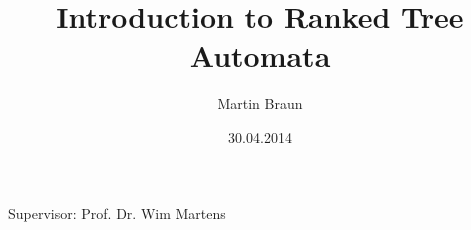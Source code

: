 \documentclass{beamer}
\title{Introduction to Ranked Tree Automata}
\author{Martin Braun}
\institute[University of Bayreuth] %
{
	University of Bayreuth
}
\date{30.04.2014}
\begin{document}
\begin{frame}
  \titlepage
   \begin{center}
	Supervisor: Prof. Dr. Wim Martens
   \end{center}
\end{frame}

\newcommand{\nfaExample}{
	 \begin{tikzpicture}[->,>=stealth',shorten >=1pt,auto,node distance=2.8cm,
                 		   semithick]
 				\tikzstyle{every state}=[fill=white,draw=black,text=black]
		
				\node[initial,state]		(A)			{$q_0$};
				\node[state,accepting]	(B)	[right of=A]	{$q_1$};
	
 				 \path (A)	edge	[loop above]	node {0}	(A)
					(A)	edge			node {1}	(B)
					(B)	edge	[loop above]	node {0}	(B)
					(B)	edge			node {1}	(A);
	\end{tikzpicture}
}

\newcommand{\nfaExampleActiveInitial}{
 	\begin{tikzpicture}[->,>=stealth',shorten >=1pt,auto,node distance=2.8cm,
                 		   semithick]
 				\tikzstyle{every state}=[fill=white,draw=black,text=black]
		
				\node[initial,state]		(A)			{\textcolor{green}{$q_0$}};
				\node[state,accepting]	(B)	[right of=A]	{$q_1$};
	
 				 \path (A)	edge	[loop above]	node {0}	(A)
					(A)	edge			node {1}	(B)
					(B)	edge	[loop above]	node {0}	(B)
					(B)	edge			node {1}	(A);
	\end{tikzpicture}
}

\newcommand{\nfaExampleActiveFinal}{
 	\begin{tikzpicture}[->,>=stealth',shorten >=1pt,auto,node distance=2.8cm,
                 		   semithick]
 				\tikzstyle{every state}=[fill=white,draw=black,text=black]
		
				\node[initial,state]		(A)			{$q_0$};
				\node[state,accepting]	(B)	[right of=A]	{\textcolor{green}{$q_1$}};
	
 				 \path (A)	edge	[loop above]	node {0}	(A)
					(A)	edge			node {1}	(B)
					(B)	edge	[loop above]	node {0}	(B)
					(B)	edge			node {1}	(A);
	\end{tikzpicture}
}
\end{document}
